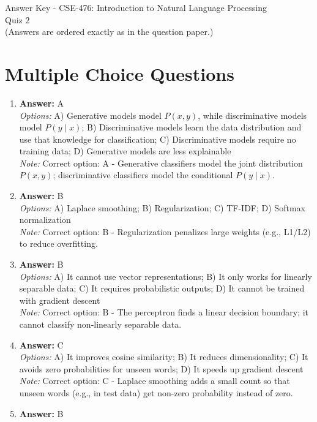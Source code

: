 \documentclass[12pt]{article}
\begin{document}
\begin{center}
Answer Key - CSE-476: Introduction to Natural Language Processing \\
Quiz 2 \\
\small (Answers are ordered exactly as in the question paper.)
\end{center}

\section*{Multiple Choice Questions}
\begin{enumerate}[label=Q\arabic*.]
\item \textbf{Answer:} A
\\ \textit{Options:} A) Generative models model $P(x,y)$, while discriminative models model $P(y \mid x)$; B) Discriminative models learn the data distribution and use that knowledge for classification; C) Discriminative models require no training data; D) Generative models are less explainable
\\ \textit{Note:} Correct option: A - Generative classifiers model the joint distribution $P(x,y)$; discriminative classifiers model the conditional $P(y \mid x)$.
\item \textbf{Answer:} B
\\ \textit{Options:} A) Laplace smoothing; B) Regularization; C) TF-IDF; D) Softmax normalization
\\ \textit{Note:} Correct option: B - Regularization penalizes large weights (e.g., L1/L2) to reduce overfitting.
\item \textbf{Answer:} B
\\ \textit{Options:} A) It cannot use vector representations; B) It only works for linearly separable data; C) It requires probabilistic outputs; D) It cannot be trained with gradient descent
\\ \textit{Note:} Correct option: B - The perceptron finds a linear decision boundary; it cannot classify non-linearly separable data.
\item \textbf{Answer:} C
\\ \textit{Options:} A) It improves cosine similarity; B) It reduces dimensionality; C) It avoids zero probabilities for unseen words; D) It speeds up gradient descent
\\ \textit{Note:} Correct option: C - Laplace smoothing adds a small count so that unseen words (e.g., in test data) get non-zero probability instead of zero.
\item \textbf{Answer:} B

\end{enumerate}
\end{document}

